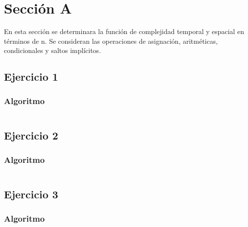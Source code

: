 \documentclass[12pt, letterpaper]{article}			%
\begin{document}
	\section{Sección A}
	En esta sección se determinara la función de complejidad temporal y espacial en términos de n. Se consideran las operaciones de asignación, aritméticas, condicionales y saltos implícitos.

	    \subsection{Ejercicio 1}
	        \subsubsection{Algoritmo}
	        \begin{lstlisting}[style=Java]

    		\end{lstlisting}

	    \subsection{Ejercicio 2}
		    \subsubsection{Algoritmo}
	        \begin{lstlisting}[style=Java]

    		\end{lstlisting}

	    \subsection{Ejercicio 3}
	    	\subsubsection{Algoritmo}
	        \begin{lstlisting}[style=Java]

    		\end{lstlisting}
\end{document}
